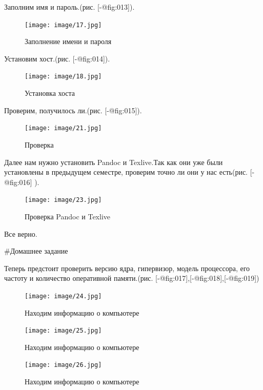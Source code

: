 Заполним имя и пароль.(рис. {[}-@fig:013{]}).

\begin{figure}
\hypertarget{fig:013}{%
\centering
\texttt{[image: image/17.jpg]}
\caption{Заполнение имени и пароля}\label{fig:013}
}
\end{figure}

Установим хост.(рис. {[}-@fig:014{]}).

\begin{figure}
\hypertarget{fig:014}{%
\centering
\texttt{[image: image/18.jpg]}
\caption{Установка хоста}\label{fig:014}
}
\end{figure}

Проверим, получилось ли.(рис. {[}-@fig:015{]}).

\begin{figure}
\hypertarget{fig:015}{%
\centering
\texttt{[image: image/21.jpg]}
\caption{Проверка}\label{fig:015}
}
\end{figure}

Далее нам нужно установить Pandoc и Texlive.Так как они уже были
установлены в предыдущем семестре, проверим точно ли они у нас есть(рис.
{[}-@fig:016{]} ).

\begin{figure}
\hypertarget{fig:016}{%
\centering
\texttt{[image: image/23.jpg]}
\caption{Проверка Pandoc и Texlive}\label{fig:016}
}
\end{figure}

Все верно.

\#Домашнее задание

Теперь предстоит проверить версию ядра, гипервизор, модель процессора,
его частоту и количество оперативной памяти.(рис.
{[}-@fig:017{]},{[}-@fig:018{]},{[}-@fig:019{]})

\begin{figure}
\hypertarget{fig:017}{%
\centering
\texttt{[image: image/24.jpg]}
\caption{Находим информацию о компьютере}\label{fig:017}
}
\end{figure}

\begin{figure}
\hypertarget{fig:018}{%
\centering
\texttt{[image: image/25.jpg]}
\caption{Находим информацию о компьютере}\label{fig:018}
}
\end{figure}

\begin{figure}
\hypertarget{fig:019}{%
\centering
\texttt{[image: image/26.jpg]}
\caption{Находим информацию о компьютере}\label{fig:019}
}
\end{figure}

